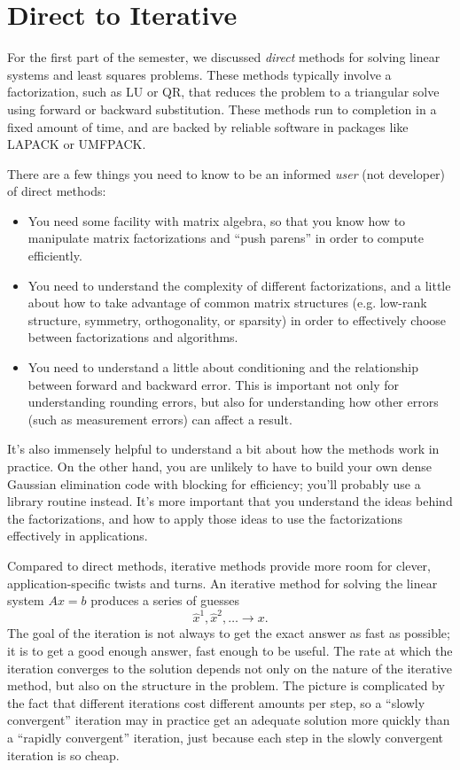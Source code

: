 \documentclass[12pt, leqno]{article}
\begin{document}

\section{Direct to Iterative}

For the first part of the semester, we discussed {\em direct} methods for
solving linear systems and least squares problems.  These methods
typically involve a factorization, such as LU or QR, that reduces the
problem to a triangular solve using forward or backward substitution.
These methods run to completion in a fixed amount of time, and are
backed by reliable software in packages like LAPACK or UMFPACK.

There are a few things you need to know to be an informed {\em user}
(not developer) of direct methods:
\begin{itemize}
\item
  You need some facility with matrix algebra, so that you know how to
  manipulate matrix factorizations and ``push parens'' in order to
  compute efficiently.
\item
  You need to understand the complexity of different factorizations,
  and a little about how to take advantage of common matrix structures
  (e.g. low-rank structure, symmetry, orthogonality, or sparsity) in
  order to effectively choose between factorizations and algorithms.
\item
  You need to understand a little about conditioning and the
  relationship between forward and backward error.  This is important
  not only for understanding rounding errors, but also for
  understanding how other errors (such as measurement errors) can
  affect a result.
\end{itemize}
It's also immensely helpful to understand a bit about how the methods
work in practice.  On the other hand, you are unlikely to have to
build your own dense Gaussian elimination code with blocking for
efficiency; you'll probably use a library routine instead.  It's more
important that you understand the ideas behind the factorizations, and
how to apply those ideas to use the factorizations effectively in
applications.

Compared to direct methods, iterative methods provide more room for
clever, application-specific twists and turns.  An iterative method
for solving the linear system $Ax = b$ produces a series of guesses
\[
  \hat{x}^1, \hat{x}^2, \ldots \rightarrow x.
\]
The goal of the iteration is not always to get the exact answer as
fast as possible; it is to get a good enough answer, fast enough to be
useful.  The rate at which the iteration converges to the solution
depends not only on the nature of the iterative method, but also on
the structure in the problem.  The picture is complicated by the fact
that different iterations cost different amounts per step, so a
``slowly convergent'' iteration may in practice get an adequate
solution more quickly than a ``rapidly convergent'' iteration, just
because each step in the slowly convergent iteration is so cheap.
\end{document}
